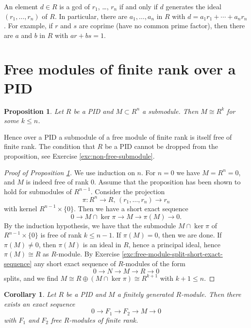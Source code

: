 \documentclass[11pt]{amsbook}
\newcommand{\longto}{\longrightarrow}
\theoremstyle{plain}
\newtheorem{corollary}[theorem]{Corollary}
\newtheorem{proposition}[theorem]{Proposition}
\theoremstyle{definition}
\begin{document}
An element $d\in R$ is a gcd of $r_1$, \ldots, $r_n$ if and only if $d$ generates the ideal $(r_1,\ldots, r_n)$ of $R$. In particular, there are $a_1,\ldots, a_n$ in $R$ with $d=a_1r_1+\cdots+a_nr_n$. For example, if $r$ and $s$ are coprime (have no common prime factor), then there are $a$ and $b$ in $R$ with $ar+bs=1$.


\section{Free modules of finite rank over a PID}



\begin{proposition}\label{prop:submodule-of-free-module-over-PID}
Let $R$ be a PID and $M\subset R^n$ a submodule. Then $M\cong R^k$ for some $k\leq n$.
\end{proposition}

Hence over a PID a submodule of a free module of finite rank is itself free of finite rank.   
The condition that $R$ be a PID cannot be dropped from the proposition, see Exercise \ref{exc:non-free-submodule}. 


\begin{proof}[Proof of Proposition \ref{prop:submodule-of-free-module-over-PID}]
We use induction on $n$. For $n=0$ we have $M=R^n=0$, and $M$ is indeed free of rank $0$. Assume that the proposition has been shown to hold for submodules of $R^{n-1}$. Consider the projection
\[
	\pi\colon R^n \to R,\, (r_1,\ldots, r_n) \to r_n
\]
with kernel $R^{n-1}\times \{0\}$. Then we have a short exact sequence
\[
	0 \longto M \cap \ker \pi \longto M \longto \pi(M) \longto 0.
\] 
By the induction hypothesis, we have that the submodule $M\cap \ker \pi$ of $R^{n-1}\times \{0\}$ is free of rank $k\leq n-1$. If $\pi(M)=0$, then we are done. If $\pi(M)\neq 0$, then $\pi(M)$ is an ideal in $R$,
hence a principal ideal, hence $\pi(M)\cong R$ as $R$-module. By Exercise \ref{exc:free-module-split-short-exact-sequence}
any short exact sequence of $R$-modules of the form
\[
	0 \longto N \longto M \longto R \longto 0
\]
splits, and we find $M \cong R \oplus (M \cap \ker \pi) \cong R^{k+1}$ with $k+1\leq n$.
\end{proof}


\begin{corollary}\label{cor:free-presentation}
Let $R$ be a PID and $M$ a finitely generated $R$-module. Then there exists an exact sequence 
\[
	0 \longto F_1 \longto F_2 \longto M \longto 0
\]
with $F_1$ and $F_2$ free $R$-modules of finite rank.
\end{corollary}
\end{document}
